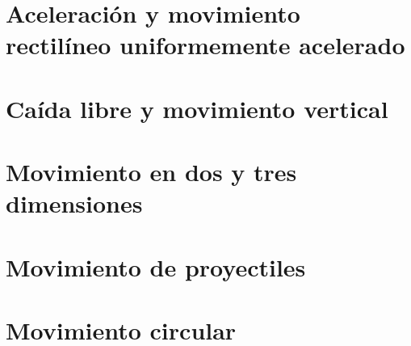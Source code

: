 ﻿\documentclass[11pt,letterpaper,openany]{book}
\newcommand{\rutaraiz}{../..}
\begin{document}
\chapter{Aceleración y movimiento rectilíneo uniformemente acelerado}





\chapter{Caída libre y movimiento vertical}





\chapter{Movimiento en dos y tres dimensiones}





\chapter{Movimiento de proyectiles}





\chapter{Movimiento circular}


\end{document}
